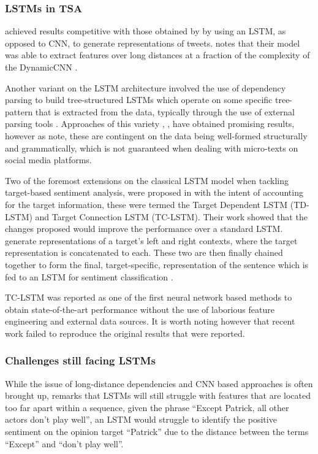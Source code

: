 \documentclass[../../fyp.tex]{subfiles}
\begin{document}
\subsubsection{LSTMs in TSA}
\cite{wang} achieved results competitive with those obtained by \cite{kalchbrenner2014} by using an LSTM, as opposed to CNN, to generate representations of tweets. \cite{young2017} notes that their model was able to extract features over long distances at a fraction of the complexity of the DynamicCNN \cite{kalchbrenner2014}.

Another variant on the LSTM architecture involved the use of dependency parsing to build tree-structured LSTMs which operate on some specific tree-pattern that is extracted from the data, typically through the use of external parsing tools \cite{socher2013}. Approaches of this variety \cite{jiweili2015}, \cite{kaishengtai2015}, \cite{zhu2015} have obtained promising results, however as \cite{chen2017} note, these are contingent on the data being well-formed structurally and grammatically, which is not guaranteed when dealing with micro-texts on social media platforms.

Two of the foremost extensions on the classical LSTM model when tackling target-based sentiment analysis, were proposed in \cite{tang2016b} with the intent of accounting for the target information, these were termed the Target Dependent LSTM (TD-LSTM) and Target Connection LSTM (TC-LSTM). Their work showed that the changes proposed would improve the performance over a standard LSTM. \cite{tang2016b} generate representations of a target's left and right contexts, where the target representation is concatenated to each. These two are then finally chained together to form the final, target-specific, representation of the sentence which is fed to an LSTM for sentiment classification \cite{dehongma2017}.

TC-LSTM \cite{tang2016b} was reported as one of the first neural network based methods to obtain state-of-the-art performance without the use of laborious feature engineering and external data sources. It is worth noting however that recent work \cite{moore2018} failed to reproduce the original results that were reported.

\subsubsection{Challenges still facing LSTMs}
While the issue of long-distance dependencies and CNN based approaches is often brought up, \cite{chen2017} remarks that LSTMs will still struggle with features that are located too far apart within a sequence, given the phrase \enquote{Except Patrick, all other actors don’t play well}, an LSTM would struggle to identify the positive sentiment on the opinion target \enquote{Patrick} due to the distance between the terms \enquote{Except} and \enquote{don't play well}.
\end{document}
